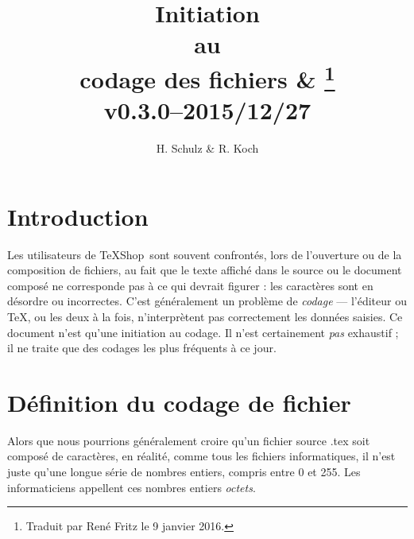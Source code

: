 \documentclass[11pt,french]{article}
\title{Initiation\\ au\\ codage des fichiers \& \TS\thanks{Traduit par René Fritz le 9 janvier 2016.}\\\small v0.3.0--2015/12/27}
\author{H. Schulz \& R. Koch}
\date{}
\newcommand{\TS}{\textsf{\TeX Shop}}
\newcommand{\cmd}[1]{\textsf{#1}}
\begin{document}
\maketitle
\thispagestyle{empty}

\section{Introduction}
Les utilisateurs de \TS\ sont souvent confrontés, lors de l'ouverture ou de la composition de fichiers, au fait que le texte affiché dans le source ou le document composé ne corresponde pas à ce qui devrait figurer : les caractères sont en désordre ou incorrectes. C'est généralement un problème de \emph{codage} --- l'éditeur ou \TeX, ou les deux à la fois, n'interprètent pas correctement les données saisies. Ce document n'est qu'une initiation au codage. Il n'est certainement \emph{pas} exhaustif ; il ne traite que des codages les plus fréquents à ce jour.

\section{Définition du codage de fichier}

Alors que nous pourrions généralement croire qu'un fichier source \cmd{.tex} soit composé de caractères, en réalité, comme tous les fichiers informatiques, il n'est juste qu'une longue série de nombres entiers, compris entre 0 et 255. Les informaticiens appellent ces nombres entiers {\em octets}.
\end{document}
